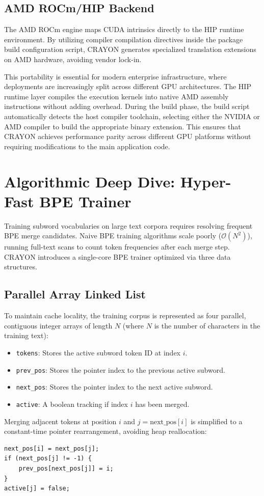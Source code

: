 \documentclass[10pt,journal,compsoc]{IEEEtran}
\begin{document}
\subsection{AMD ROCm/HIP Backend}
The AMD ROCm engine maps CUDA intrinsics directly to the HIP runtime environment. By utilizing compiler compilation directives inside the package build configuration script, CRAYON generates specialized translation extensions on AMD hardware, avoiding vendor lock-in.

This portability is essential for modern enterprise infrastructure, where deployments are increasingly split across different GPU architectures. The HIP runtime layer compiles the execution kernels into native AMD assembly instructions without adding overhead. During the build phase, the build script automatically detects the host compiler toolchain, selecting either the NVIDIA or AMD compiler to build the appropriate binary extension. This ensures that CRAYON achieves performance parity across different GPU platforms without requiring modifications to the main application code.

\section{Algorithmic Deep Dive: Hyper-Fast BPE Trainer}
Training subword vocabularies on large text corpora requires resolving frequent BPE merge candidates. Naive BPE training algorithms scale poorly ($\mathcal{O}(N^2)$), running full-text scans to count token frequencies after each merge step. CRAYON introduces a single-core BPE trainer optimized via three data structures.

\subsection{Parallel Array Linked List}
To maintain cache locality, the training corpus is represented as four parallel, contiguous integer arrays of length $N$ (where $N$ is the number of characters in the training text):
\begin{itemize}
    \item \texttt{tokens}: Stores the active subword token ID at index $i$.
    \item \texttt{prev\_pos}: Stores the pointer index to the previous active subword.
    \item \texttt{next\_pos}: Stores the pointer index to the next active subword.
    \item \texttt{active}: A boolean tracking if index $i$ has been merged.
\end{itemize}
Merging adjacent tokens at position $i$ and $j = \text{next\_pos}[i]$ is simplified to a constant-time pointer rearrangement, avoiding heap reallocation:
\begin{lstlisting}[caption={Linked List Pointer Adjustments}]
next_pos[i] = next_pos[j];
if (next_pos[j] != -1) {
    prev_pos[next_pos[j]] = i;
}
active[j] = false;
\end{lstlisting}
\end{document}
